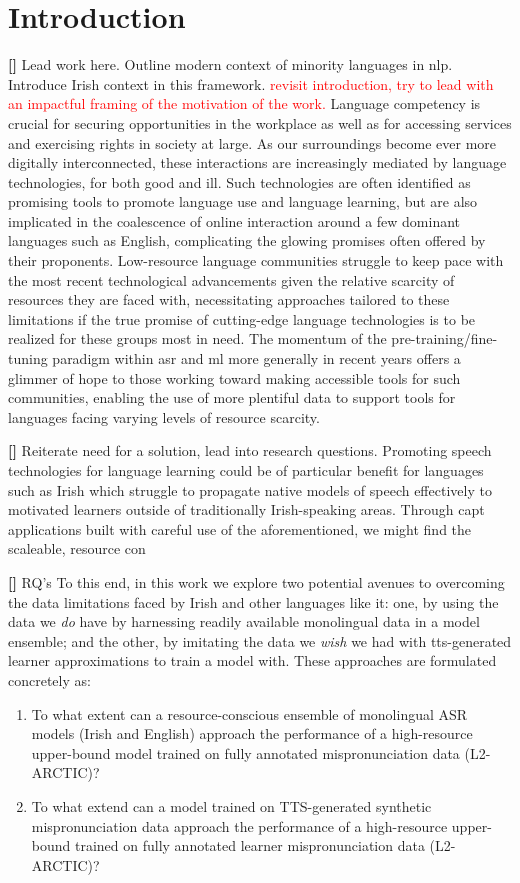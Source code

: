 \documentclass[thesis]{cluu}
\newcounter{paranum}
\newcommand{\numberedparagraph}{\par\refstepcounter{paranum}\textbf{[\theparanum] }}
\newcommand{\todo}[1]{\textcolor{red}{#1}}
\begin{document}
\chapter{Introduction}
\numberedparagraph{Lead work here. Outline modern context of minority languages in nlp. Introduce Irish context in this framework.}
\todo{revisit introduction, try to lead with an impactful framing of the motivation of the work.}
Language competency is crucial for securing opportunities in the workplace as well as for accessing services and exercising rights in society at large. As our surroundings become ever more digitally interconnected, these interactions are increasingly mediated by language technologies, for both good and ill. Such technologies are often identified as promising tools to promote language use and language learning, but are also implicated in the coalescence of online interaction around a few dominant languages such as English, complicating the glowing promises often offered by their proponents. Low-resource language communities struggle to keep pace with the most recent technological advancements given the relative scarcity of resources they are faced with, necessitating approaches tailored to these limitations if the true promise of cutting-edge language technologies is to be realized for these groups most in need. The momentum of the pre-training/fine-tuning paradigm within \gls{asr} and \gls{ml} more generally in recent years offers a glimmer of hope to those working toward making accessible tools for such communities, enabling the use of more plentiful data to support tools for languages facing varying levels of resource scarcity.

\numberedparagraph{Reiterate need for a solution, lead into research questions.} 
Promoting speech technologies for language learning could be of particular benefit for languages such as Irish which struggle to propagate native models of speech effectively to motivated learners outside of traditionally Irish-speaking areas. Through \gls{capt} applications built with careful use of the aforementioned, we might find the scaleable, resource con

\numberedparagraph{RQ's} 
To this end, in this work we explore two potential avenues to overcoming the data limitations faced by Irish and other languages like it: one, by using the data we \textit{do} have by harnessing readily available monolingual data in a model ensemble; and the other, by imitating the data we \textit{wish} we had with \gls{tts}-generated learner approximations to train a model with. These approaches are formulated concretely as:
\begin{enumerate}
  \item To what extent can a resource-conscious ensemble of monolingual ASR models (Irish and English) approach the performance of a high-resource upper-bound model trained on fully annotated mispronunciation data (L2-ARCTIC)?
  \item To what extend can a model trained on TTS-generated synthetic mispronunciation data approach the performance of a high-resource upper-bound trained on fully annotated learner mispronunciation data (L2-ARCTIC)?
\end{enumerate}
\end{document}
